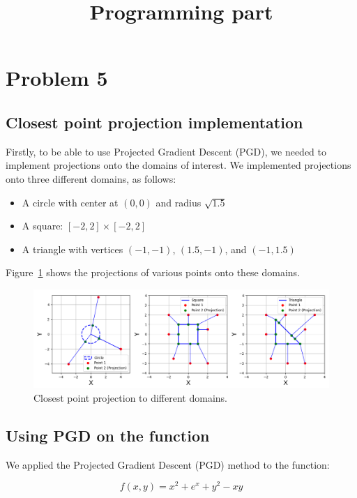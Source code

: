 \documentclass[9pt]{IEEEtran}
\title{\vspace{0ex}
Programming part}
\begin{document}
\maketitle

\section{Problem 5}
\subsection{Closest point projection implementation}
Firstly, to be able to use Projected Gradient Descent (PGD), we needed to implement projections onto the domains of interest. We implemented projections onto three different domains, as follows:

\begin{itemize}
    \item A circle with center at \((0,0)\) and radius \(\sqrt{1.5}\)
    \item A square: \([-2, 2] \times [-2, 2]\)
    \item A triangle with vertices \((-1, -1)\), \((1.5, -1)\), and \((-1, 1.5)\)
\end{itemize}


Figure~\ref{fig:proj} shows the projections of various points onto these domains. 
\vspace{-0pt}
\begin{figure}[h]
    \centering
    \includegraphics[width=0.99\columnwidth]{figures/projections.png}
    \caption{Closest point projection to different domains.}
    \label{fig:proj}
\end{figure}

\subsection{Using PGD on the function}
We applied the Projected Gradient Descent (PGD) method to the function:

\[
f(x,y) = x^2 + e^x + y^2 - xy
\]
\end{document}

